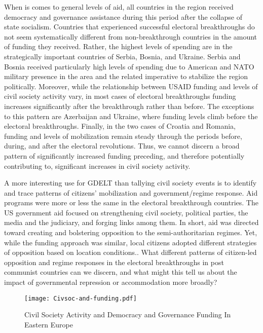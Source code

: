 \documentclass[10pt]{article}
\begin{document}
When is comes to general levels of aid, all countries in the region received democracy and governance assistance during this period after the collapse of state socialism.  Countries that experienced successful electoral breakthroughs do not seem systematically different from non-breakthrough countries in the amount of funding they received. Rather, the highest levels of spending are in the strategically important countries of Serbia, Bosnia, and Ukraine.  Serbia and Bosnia received particularly high levels of spending due to American and NATO military presence in the area and the related imperative to stabilize the region politically.   Moreover, while the relationship between USAID funding and levels of civil society activity vary,  in most cases of electoral breakthroughs funding increases significantly after the breakthrough rather than before.  The exceptions to this pattern are Azerbaijan and Ukraine, where funding levels climb before the electoral breakthroughs.  Finally, in the two cases of Croatia and Romania, funding and levels of mobilization remain steady through the periods before, during, and after the electoral revolutions.  Thus, we cannot discern a broad pattern of significantly increased funding preceding, and therefore potentially contributing to, significant increases in civil society activity.


A more interesting use for GDELT than tallying civil society events is to identify and trace patterns of citizens' mobilization and government/regime response.  Aid programs were more or less the same in the electoral breakthrough countries. The US government aid focused on strengthening civil society, political parties, the media and the judiciary, and forging links among them.  In short, aid was directed toward creating and bolstering opposition to the semi-authoritarian regimes.  Yet, while the funding approach was similar, local citizens adopted different strategies of opposition based on location conditions.. What different patterns of citizen-led opposition and regime responses in the electoral breakthroughs in post communist countries can we discern, and what might this tell us about the impact of governmental repression or accommodation more broadly?

\begin{center}
\begin{figure*}
\texttt{[image: Civsoc-and-funding.pdf]}
\caption{Civil Society Activity and Democracy and Governance Funding In Eastern Europe}
\label{many-box-chart}
\end{figure*}
\end{center}
\clearpage
\end{document}
